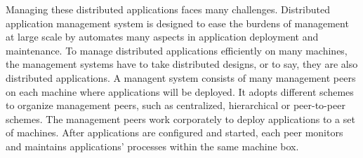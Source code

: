 




Managing these distributed applications faces many
challenges. Distributed application management system is
designed to ease the burdens of management at large scale by
automates many aspects in application deployment and
maintenance.  To manage distributed applications efficiently
on many machines, the management systems have to take
distributed designs, or to say, they are also distributed
applications.  A managent system consists of many management
peers on each machine where applications will be deployed.
It adopts different schemes to organize management peers,
such as centralized, hierarchical or peer-to-peer schemes.
The management peers work corporately to deploy applications
to a set of machines. After applications are configured and
started, each peer monitors and maintains applications'
processes within the same machine box.



